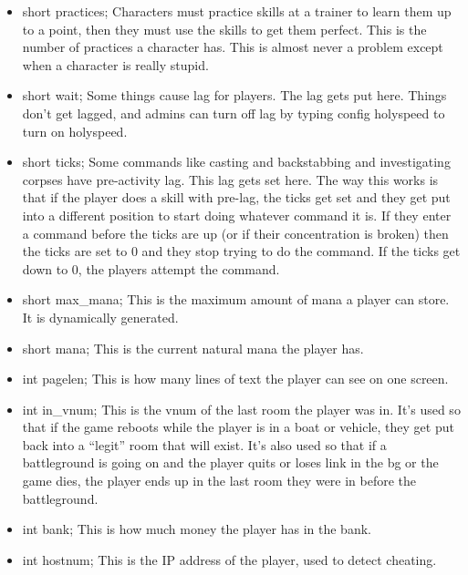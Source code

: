 \begin{itemize}
\item  short practices;            Characters must practice skills at
a trainer to learn them up to a point, then they must use the skills
to get them perfect. This is the number of practices a character
has. This is almost never a problem except when a character is really
stupid.


\item  short wait;                  Some things cause lag for
players. The lag gets put here. Things don't get lagged, and admins
can turn off lag by typing config holyspeed to turn on holyspeed.

 \item short ticks;        Some commands like casting and backstabbing
 and investigating corpses have pre-activity lag. This lag gets set
 here. The way this works is that if the player does a skill with
 pre-lag, the ticks get set and they get put into a different position
 to start doing whatever command it is. If they enter a command before
 the ticks are up (or if their concentration is broken) then the ticks
 are set to 0 and they stop trying to do the command. If the ticks get
 down to 0, the players attempt the command.         

 \item short max\_mana;           This is the maximum amount of mana a
 player can store. It is dynamically generated.

 \item short mana;                   This is the current natural mana
 the player has.
 
\item	int pagelen; This is how many lines of text the player can see
 on one screen.

 \item int in\_vnum;                  This is the vnum of the last
 room the player was in. It's used so that if the game reboots while
 the player is in a boat or vehicle, they get put back into a
 ``legit'' room that will exist. It's also used so that if a
 battleground is going on and the player quits or loses link in the bg
 or the game dies, the player ends up in the last room they were in
 before the battleground.

 \item int bank; This is how much money the player has in the bank.

 \item int hostnum;                This is the IP address of the
 player, used to detect cheating.



\end{itemize}
